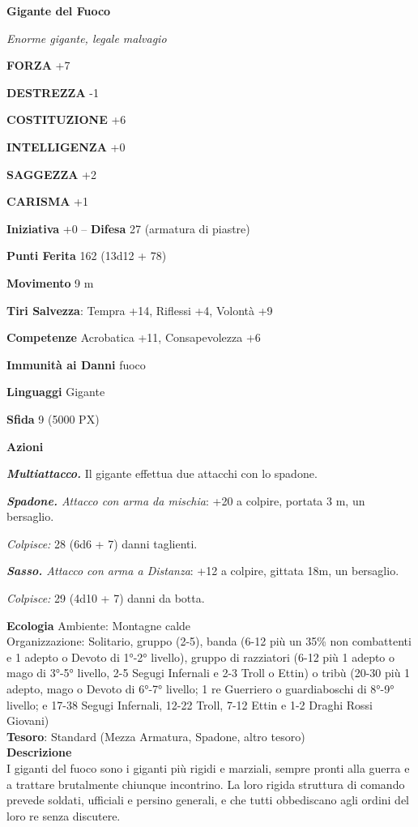 \begin{multicols}{2}
	\medskip{}\textbf{Gigante del Fuoco}

	\textit{Enorme gigante, legale malvagio}

	\textbf{FORZA} +7

	\textbf{DESTREZZA} -1

	\textbf{COSTITUZIONE} +6

	\textbf{INTELLIGENZA} +0

	\textbf{SAGGEZZA} +2

	\textbf{CARISMA} +1

	\textbf{Iniziativa} +0 -- \textbf{Difesa} 27 (armatura di piastre)

	\textbf{Punti Ferita} 162 (13d12 + 78)

	\textbf{Movimento} 9 m

	\textbf{Tiri Salvezza}: Tempra +14, Riflessi +4, Volontà +9

	\textbf{Competenze} Acrobatica +11, Consapevolezza +6

	\textbf{Immunità ai Danni} fuoco

	\textbf{Linguaggi} Gigante

	\textbf{Sfida} 9 (5000 PX)

	\textbf{Azioni}

	\textit{\textbf{Multiattacco.}} Il gigante effettua due attacchi con lo spadone.

	\textit{\textbf{Spadone.} Attacco con arma da mischia}: +20 a colpire, portata 3 m, un bersaglio.

	\textit{Colpisce:} 28 (6d6 + 7) danni taglienti.

	\textit{\textbf{Sasso.} Attacco con arma a Distanza}: +12 a colpire, gittata 18m, un bersaglio.

	\textit{Colpisce:} 29 (4d10 + 7) danni da botta.

	\textbf{Ecologia}
	Ambiente: Montagne calde\\
	Organizzazione: Solitario, gruppo (2-5), banda (6-12 più un 35\% non combattenti e 1 adepto o Devoto di 1°-2° livello), gruppo di razziatori (6-12 più 1 adepto o mago di 3°-5° livello, 2-5 Segugi Infernali e 2-3 Troll o Ettin) o tribù (20-30 più 1 adepto, mago o Devoto di 6°-7° livello; 1 re Guerriero o guardiaboschi di 8°-9° livello; e 17-38 Segugi Infernali, 12-22 Troll, 7-12 Ettin e 1-2 Draghi Rossi Giovani)\\
	\textbf{Tesoro}: Standard (Mezza Armatura, Spadone, altro tesoro)\\
	\textbf{Descrizione}\\
	I giganti del fuoco sono i giganti più rigidi e marziali, sempre pronti alla guerra e a trattare brutalmente chiunque incontrino. La loro rigida struttura di comando prevede soldati, ufficiali e persino generali, e che tutti obbediscano agli ordini del loro re senza discutere.


\end{multicols}
